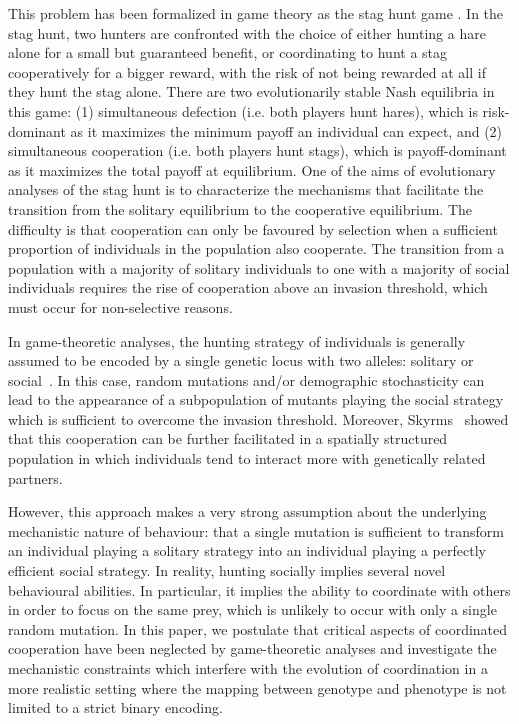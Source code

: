     This problem has been formalized in game theory as the stag hunt game \cite{Skyrms2004}. In the stag hunt, two hunters are confronted with the choice of either hunting a hare alone for a small but guaranteed benefit, or coordinating to hunt a stag cooperatively for a bigger reward, with the risk of not being rewarded at all if they hunt the stag alone. There are two evolutionarily stable Nash equilibria in this game: (1) simultaneous defection (i.e. both players hunt hares), which is risk-dominant as it maximizes the minimum payoff an individual can expect, and (2) simultaneous cooperation (i.e. both players hunt stags), which is payoff-dominant as it maximizes the total payoff at equilibrium. One of the aims of evolutionary analyses of the stag hunt is to characterize the mechanisms that facilitate the transition from the solitary equilibrium to the cooperative equilibrium. The difficulty is that cooperation can only be favoured by selection when a sufficient proportion of individuals in the population also cooperate. The transition from a population with a majority of solitary individuals to one with a majority of social individuals requires the rise of cooperation above an invasion threshold, which must occur for non-selective reasons.

    In game-theoretic analyses, the hunting strategy of individuals is generally assumed to be encoded by a single genetic locus with two alleles: solitary or social~\cite{Skyrms2004}. In this case, random mutations and/or demographic stochasticity can lead to the appearance of a subpopulation of mutants playing the social strategy which is sufficient to overcome the invasion threshold. Moreover, Skyrms~\cite{Skyrms2004} showed that this cooperation can be further facilitated in a spatially structured population in which individuals tend to interact more with genetically related partners. 

    However, this approach makes a very strong assumption about the underlying mechanistic nature of behaviour: that a single mutation is sufficient to transform an individual playing a solitary strategy into an individual playing a perfectly efficient social strategy. In reality, hunting socially implies several novel behavioural abilities. In particular, it implies the ability to coordinate with others in order to focus on the same prey, which is unlikely to occur with only a single random mutation. In this paper, we postulate that critical aspects of coordinated cooperation have been neglected by game-theoretic analyses and investigate the mechanistic constraints which interfere with the evolution of coordination in a more realistic setting where the mapping between genotype and phenotype is not limited to a strict binary encoding. 

